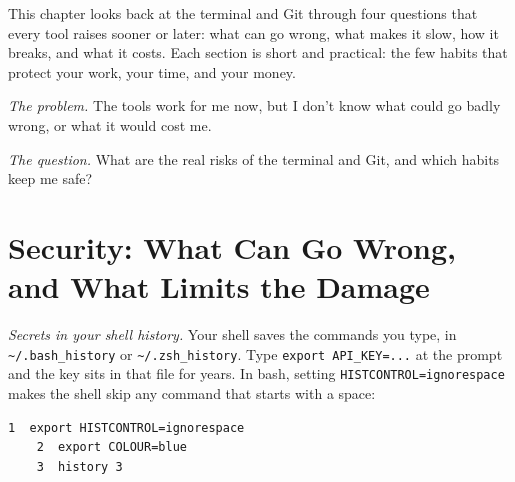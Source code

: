 
\begin{chapterintro}

This chapter looks back at the terminal and Git through four questions that every tool raises sooner or later: what can go wrong, what makes it slow, how it breaks, and what it costs. Each section is short and practical: the few habits that protect your work, your time, and your money.

\end{chapterintro}

\emph{The problem.} The tools work for me now, but I don't know what could go badly wrong, or what it would cost me.

\emph{The question.} What are the real risks of the terminal and Git, and which habits keep me safe?

\section{Security: What Can Go Wrong, and What Limits the Damage}\label{12-security-speed-failure-and-cost:security-what-can-go-wrong-and-what-limits-the-damage}

\emph{Secrets in your shell history.} Your shell saves the commands you type, in \texttt{\textasciitilde{}/.bash\_history} or \texttt{\textasciitilde{}/.zsh\_history}. Type \texttt{export\ API\_KEY=}\allowbreak{}\texttt{...} at the prompt and the key sits in that file for years. In bash, setting \texttt{HISTCONTROL=}\allowbreak{}\texttt{ignorespace} makes the shell skip any command that starts with a space:

\begin{codeblock}

\begin{Shaded}
\begin{Highlighting}[]
 \OperatorTok{=}
  \OperatorTok{=}
 \OperatorTok{=}
\end{Highlighting}
\end{Shaded}

\end{codeblock}

\begin{codeblock}
\begin{Verbatim}[formatcom=\outputstyle]
    1  export HISTCONTROL=ignorespace
    2  export COLOUR=blue
    3  history 3
\end{Verbatim}
\end{codeblock}

